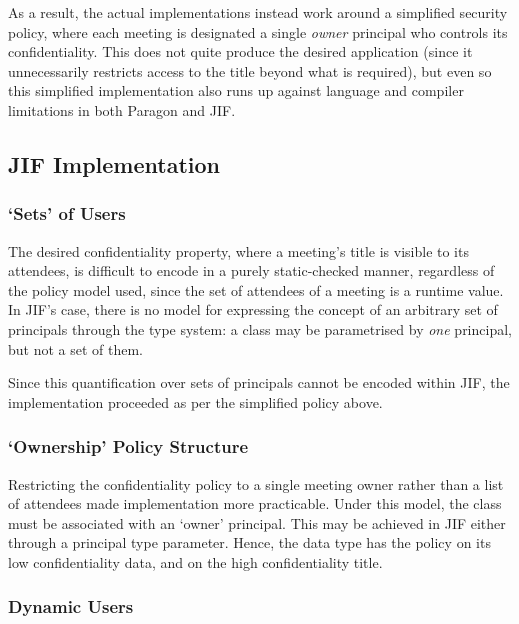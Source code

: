 As a result, the actual implementations instead work around a simplified security policy, where each meeting is designated a single \textit{owner} principal who controls its confidentiality. This does not quite produce the desired application (since it unnecessarily restricts access to the title beyond what is required), but even so this simplified implementation also runs up against language and compiler limitations in both Paragon and JIF.

\subsection{JIF Implementation}

\subsubsection{`Sets' of Users}

The desired confidentiality property, where a meeting's title is visible to its attendees, is difficult to encode in a purely static-checked manner, regardless of the policy model used, since the set of attendees of a meeting is a runtime value. In JIF's case, there is no model for expressing the concept of an arbitrary set of principals through the type system: a class may be parametrised by \textit{one} principal, but not a set of them.

Since this quantification over sets of principals cannot be encoded within JIF, the implementation proceeded as per the simplified policy above.

\subsubsection{`Ownership' Policy Structure}

Restricting the confidentiality policy to a single meeting owner rather than a list of attendees made implementation more practicable. Under this model, the  class must be associated with an `owner' principal. This may be achieved in JIF either through a principal type parameter. Hence, the  data type has the policy  on its low confidentiality data, and  on the high confidentiality title.

\subsubsection{Dynamic Users}

